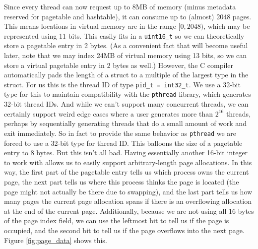 \documentclass{article}
\begin{document}
Since every thread can now request up to 8MB of memory (minus metadata reserved for pagetable and hashtable), it can consume up to (almost) 2048 pages. This means locations in virtual memory are in the range $[0,2048)$, which may be represented using 11 bits. This easily fits in a \verb|uint16_t| so we can theoretically store a pagetable entry in 2 bytes. (As a convenient fact that will become useful later, note that we may index 24MB of virtual memory using 13 bits, so we can store a virtual pagetable entry in 2 bytes as well.) However, the C compiler automatically pads the length of a struct to a multiple of the largest type in the struct. For us this is the thread ID of type \verb|pid_t = int32_t|. We use a 32-bit type for this to maintain compatibility with the \verb|pthread| library, which generates 32-bit thread IDs. And while we can't support many concurrent threads, we can certainly support weird edge cases where a user generates more than $2^16$ threads, perhaps by sequentially generating threads that do a small amount of work and exit immediately. So in fact to provide the same behavior as \verb|pthread| we are forced to use a 32-bit type for thread ID. This balloons the size of a pagetable entry to 8 bytes. But this isn't all bad. Having essentially another 16-bit integer to work with allows us to easily support arbitrary-length page allocations. In this way, the first part of the pagetable entry tells us which process owns the current page, the next part tells us where this process thinks the page is located (the page might not actually be there due to swapping), and the last part tells us how many pages the current page allocation spans if there is an overflowing allocation at the end of the current page. Additionally, because we are not using all 16 bytes of the page index field, we can use the leftmost bit to tell us if the page is occupied, and the second bit to tell us if the page overflows into the next page. Figure \ref{fig:page_data} shows this. 
\end{document}
